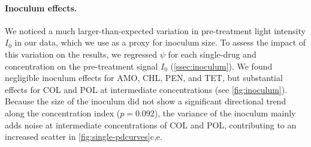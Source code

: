 \paragraph{Inoculum effects.}
We noticed a much larger-than-expected variation in pre-treatment light intensity \(I_0\) in our data, which we use as a proxy for inoculum size.
To assess the impact of this variation on the results, we regressed \(\psi\) for each single-drug and concentration on the pre-treatment signal \(I_0\) (\autoref{ssec:inoculum}).
We found negligible inoculum effects for AMO, CHL, PEN, and TET, but substantial effects for COL and POL at intermediate concentrations (see \autoref{fig:inoculum}).
Because the size of the inoculum did not show a significant directional trend along the concentration index (\(p=0.092\)), the variance of the inoculum mainly adds noise at intermediate concentrations of COL and POL, contributing to an increased scatter in \autoref{fig:single-pdcurves}c,e.
